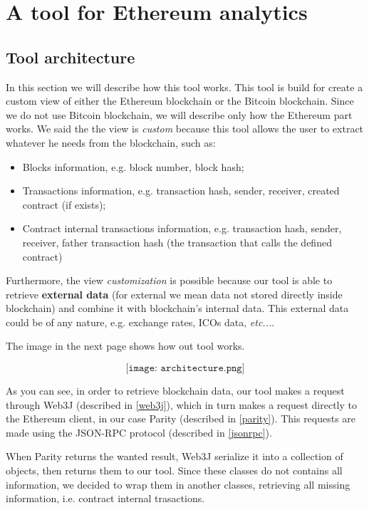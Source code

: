 \label{Chapter3}

\chapter{A tool for Ethereum analytics}
\section{Tool architecture}
In this section we will describe how this tool works. This tool is build for create a custom view of either the Ethereum blockchain or the Bitcoin blockchain.
\newline 
Since we do not use Bitcoin blockchain, we will describe only how the Ethereum part works. We said the the view is \textit{custom} because this tool allows the user to extract whatever he needs from the blockchain, such as:
\begin{itemize}
    \item Blocks information, e.g. block number, block hash;
    \item Transactions information, e.g. transaction hash, sender, receiver, created contract (if exists);
    \item Contract internal transactions information, e.g. transaction hash, sender, receiver, father transaction hash (the transaction that calls the defined contract)
\end{itemize}

Furthermore, the view \textit{customization} is possible because our tool is able to retrieve \textbf{external data} (for external we mean data not stored directly inside blockchain) and combine it with blockchain's internal data. This external data could be of any nature, e.g. exchange rates, ICOs data, \textit{etc...}.

The image in the next page shows how out tool works. %
\begin{center}
    \[
        \texttt{[image: architecture.png]}
    \]
\end{center}
As you can see, in order to retrieve blockchain data, our tool makes a request through Web3J (described in \ref{web3j}), which in turn makes a request directly to the Ethereum client, in our case Parity (described in \ref{parity}). This requests are made using the JSON-RPC protocol (described in \ref{jsonrpc}). 

When Parity returns the wanted result, Web3J serialize it into a collection of objects, then returns them to our tool. Since these classes do not contains all information, we decided to wrap them in another classes, retrieving all missing information, i.e. contract internal trasactions.

